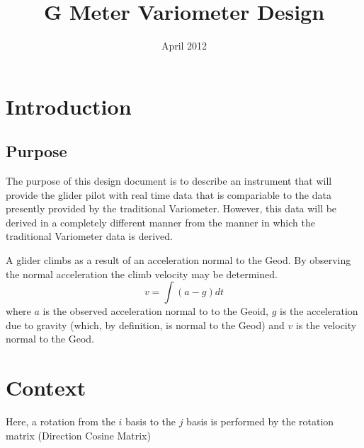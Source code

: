 \documentclass[a4paper]{report}
\title{G Meter Variometer Design}
\numberwithin{equation}{chapter}
\begin{document}
\maketitle
\date{April 2012}

\clearpage\setcounter{page}{1}
\thispagestyle{Contents}

\tableofcontents

\clearpage\setcounter{page}{1}
\thispagestyle{Contents}

\listoffigures


\clearpage\setcounter{page}{1}
\chapter[Introduction]{Introduction}

\section[Purpose]{Purpose}

The purpose of this design document is to describe an instrument that will provide the glider pilot with real time data that is compariable to the data presently provided by the traditional Variometer. However, this data will be derived in a completely different manner from the manner in which the traditional Variometer data is derived.

\bigskip

A glider climbs as a result of an acceleration normal to the Geod. By observing the normal acceleration the climb velocity may be determined.
\begin{equation}
\label{BasicVarioEquation}
v = \int{\left( a - g \right)} dt
\end{equation}
where $a$ is the observed acceleration normal to to the Geoid, $g$ is the acceleration due to gravity (which, by definition, is normal to the Geod) and $v$ is the velocity normal to the Geod.

\clearpage\setcounter{page}{1}
\chapter[Context]{Context}

Here, a rotation from the $i$ basis to the $j$ basis is performed by the rotation matrix (Direction Cosine Matrix)
\end{document}
